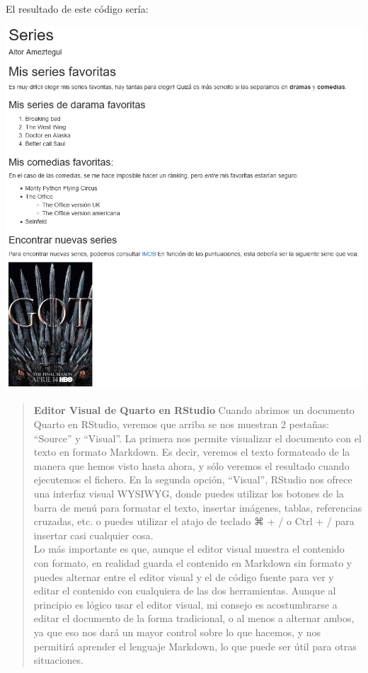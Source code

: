 \documentclass[
  letterpaper,
  DIV=11,
  numbers=noendperiod]{scrreprt}
\begin{document}
El resultado de este código sería:

\includegraphics{images/series.png}

\begin{quote}
\textbf{Editor Visual de Quarto en RStudio} Cuando abrimos un documento
Quarto en RStudio, veremos que arriba se nos muestran 2 pestañas:
``Source'' y ``Visual''. La primera nos permite visualizar el documento
con el texto en formato Markdown. Es decir, veremos el texto formateado
de la manera que hemos visto hasta ahora, y sólo veremos el resultado
cuando ejecutemos el fichero. En la segunda opción, ``Visual'', RStudio
nos ofrece una interfaz visual WYSIWYG, donde puedes utilizar los
botones de la barra de menú para formatar el texto, insertar imágenes,
tablas, referencias cruzadas, etc. o puedes utilizar el atajo de teclado
⌘ + / o Ctrl + / para insertar casi cualquier cosa. \\
Lo más importante es que, aunque el editor visual muestra el contenido
con formato, en realidad guarda el contenido en Markdown sin formato y
puedes alternar entre el editor visual y el de código fuente para ver y
editar el contenido con cualquiera de las dos herramientas. Aunque al
principio es lógico usar el editor visual, mi consejo es acostumbrarse a
editar el documento de la forma tradicional, o al menos a alternar
ambos, ya que eso nos dará un mayor control sobre lo que hacemos, y nos
permitirá aprender el lenguaje Markdown, lo que puede ser útil para
otras situaciones.
\end{quote}
\end{document}
